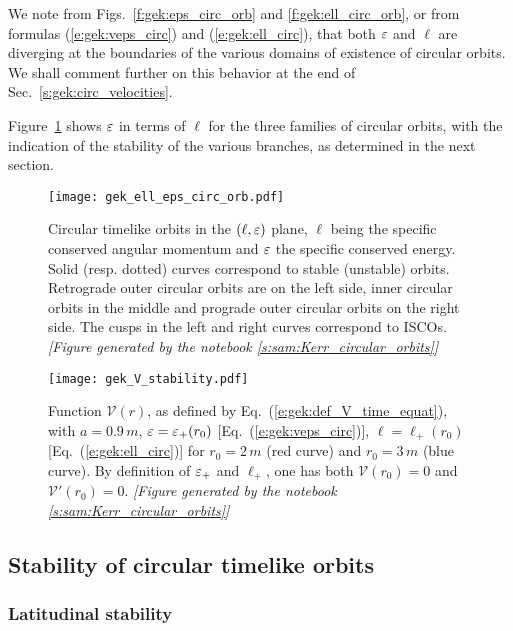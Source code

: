 We note from Figs.~\ref{f:gek:eps_circ_orb} and \ref{f:gek:ell_circ_orb},
or from formulas (\ref{e:gek:veps_circ}) and (\ref{e:gek:ell_circ}),
that both $\varepsilon$ and $\ell$ are diverging at the boundaries of the various domains
of existence of circular orbits. We shall comment further on this behavior at the end of
Sec.~\ref{s:gek:circ_velocities}.

Figure~\ref{f:gek:ell_eps_circ_orb} shows $\varepsilon$ in terms of $\ell$
for the three families of circular orbits, with the indication of
the stability of the various
branches, as determined in the next section.

\begin{figure}
\centerline{\texttt{[image: gek\_ell\_eps\_circ\_orb.pdf]}}
\caption[]{\label{f:gek:ell_eps_circ_orb} \footnotesize
Circular timelike orbits in the $(\ell,\varepsilon)$ plane, $\ell$ being the
specific conserved angular momentum and $\varepsilon$ the specific conserved
energy. Solid (resp. dotted) curves correspond to stable (unstable) orbits.
Retrograde outer circular orbits are on the left side, inner circular orbits
in the middle and prograde outer circular orbits on the right side.
The cusps in the left and right curves correspond to ISCOs.
\textsl{[Figure generated by the notebook \ref{s:sam:Kerr_circular_orbits}]}
}
\end{figure}



\begin{figure}
\centerline{\texttt{[image: gek\_V\_stability.pdf]}}
\caption[]{\label{f:gek:V_stability} \footnotesize
Function $\mathcal{V}(r)$, as defined by Eq.~(\ref{e:gek:def_V_time_equat}),
with $a=0.9\, m$, $\varepsilon = \varepsilon_+(r_0)$ [Eq.~(\ref{e:gek:veps_circ})],
$\ell = \ell_+(r_0)$ [Eq.~(\ref{e:gek:ell_circ})] for $r_0 = 2\, m$
(red curve) and $r_0 = 3 \, m$ (blue curve). By definition of $\varepsilon_+$ and $\ell_+$,
one has both $\mathcal{V}(r_0) = 0$ and $\mathcal{V}'(r_0) = 0$.
\textsl{[Figure generated by the notebook \ref{s:sam:Kerr_circular_orbits}]}
}
\end{figure}



\subsection{Stability of circular timelike orbits} \label{s:gek:circ_orb_stab}

\subsubsection{Latitudinal stability}

